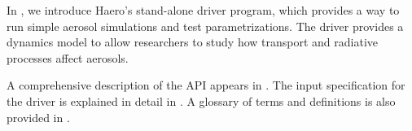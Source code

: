 In , we introduce Haero's stand-alone driver program, which
provides a way to run simple aerosol simulations and test parametrizations.
The driver provides a dynamics model to allow researchers to study how transport
and radiative processes affect aerosols.

A comprehensive description of the API appears in . The input
specification for the driver is explained in detail in .
A glossary of terms and definitions is also provided in .

